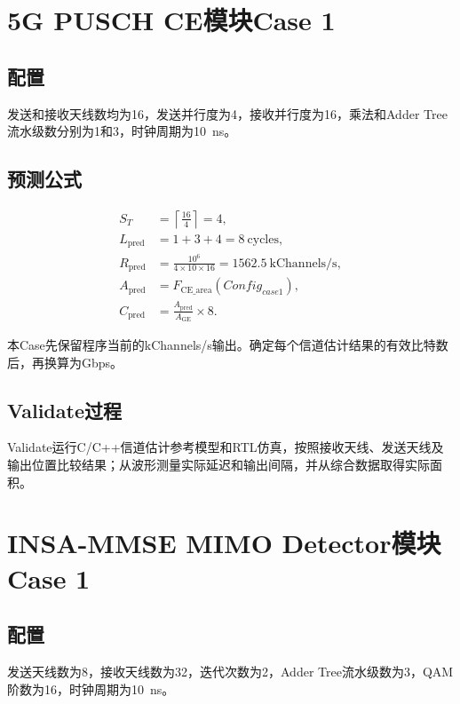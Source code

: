 \documentclass[a4paper,oneside,11pt]{ctexrep}
\begin{document}
\section{5G PUSCH CE模块Case 1}

\subsection{配置}

发送和接收天线数均为16，发送并行度为4，接收并行度为16，乘法和Adder Tree流水级数分别为1和3，时钟周期为\SI{10}{\nano\second}。

\subsection{预测公式}

\begin{align}
    S_T &= \left\lceil\frac{16}{4}\right\rceil=4,\\
    L_{\mathrm{pred}} &= 1+3+4=8\ \mathrm{cycles},\\
    R_{\mathrm{pred}} &= \frac{10^6}{4\times10\times16}=1562.5\ \mathrm{kChannels/s},\\
    A_{\mathrm{pred}} &= F_{\mathrm{CE\_area}}(Config_{case1}),\\
    C_{\mathrm{pred}} &= \frac{A_{\mathrm{pred}}}{A_{\mathrm{GE}}}\times8.
\end{align}

本Case先保留程序当前的kChannels/s输出。确定每个信道估计结果的有效比特数后，再换算为Gbps。

\subsection{Validate过程}

Validate运行C/C++信道估计参考模型和RTL仿真，按照接收天线、发送天线及输出位置比较结果；从波形测量实际延迟和输出间隔，并从综合数据取得实际面积。

\section{INSA-MMSE MIMO Detector模块Case 1}

\subsection{配置}

发送天线数为8，接收天线数为32，迭代次数为2，Adder Tree流水级数为3，QAM阶数为16，时钟周期为\SI{10}{\nano\second}。
\end{document}
